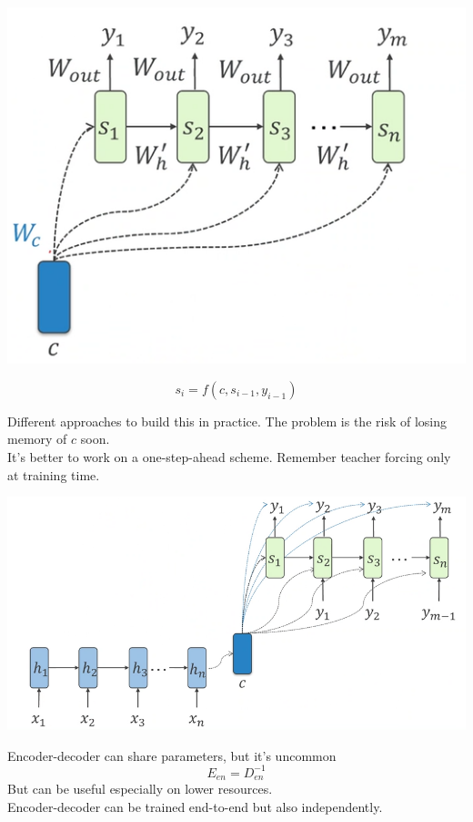 \documentclass[10pt]{report}
\begin{document}
\begin{list}{}{}
\begin{center}
		\includegraphics[scale=0.45]{110.png}
	\end{center}
	$$s_i = f(c, s_{i-1}, y_{i-1})$$
\end{list}
Different approaches to build this in practice. The problem is the risk of losing memory of $c$ soon.\\
It's better to work on a one-step-ahead scheme. Remember teacher forcing only at training time.
\begin{center}
	\includegraphics[scale=0.5]{111.png}
\end{center}
Encoder-decoder can share parameters, but it's uncommon
$$E_{en} = D^{-1}_{en}$$
But can be useful especially on lower resources.\\
Encoder-decoder can be trained end-to-end but also independently.
\end{document}
